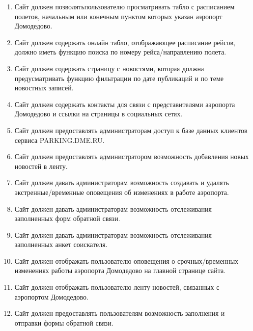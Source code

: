 
\begin{enumerate}
      \item Сайт должен позволятьпользователю просматривать
            табло с расписанием полетов, начальным или конечным
            пунктом которых указан аэропорт Домодедово.
      \item Сайт должен содержать онлайн табло, отображающее расписание рейсов,
            должно иметь функцию поиска по номеру
            рейса/направлению полета.
      \item Сайт должен содержать страницу с новостями, которая должна
            предусматривать функцию фильтрации по дате публикаций и по
            теме новостных записей.
      \item Сайт должен содержать контакты для связи с
            представителями аэропорта Домодедово и ссылки
            на страницы в социальных сетях.

      \item Сайт должен предоставлять администраторам
            доступ к базе данных клиентов сервиса PARKING.DME.RU.

      \item Сайт должен предоставлять администратором возможность
            добавления новых новостей в ленту.

      \item Сайт должен давать администраторам возможность
            создавать и удалять экстренные/временные
            оповещения об изменениях в работе аэропорта.

      \item Сайт должен давать администраторам возможность
            отслеживания заполненных форм обратной связи.

      \item Сайт должен давать администраторам возможность
            отслеживания заполненных анкет соискателя.

      \item Сайт должен отображать пользователю оповещения о
            срочных/временных изменениях работы аэропорта
            Домодедово на главной странице сайта.

      \item Сайт должен отображать пользователю ленту
            новостей, связанных с аэропортом Домодедово.

      \item Сайт должен предоставлять пользователям возможность заполнения
            и отправки формы обратной связи.


\end{enumerate}
